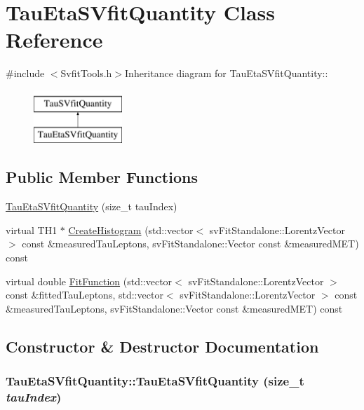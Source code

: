 \hypertarget{classTauEtaSVfitQuantity}{
\section{TauEtaSVfitQuantity Class Reference}
\label{classTauEtaSVfitQuantity}
}


{\ttfamily \#include $<$SvfitTools.h$>$}Inheritance diagram for TauEtaSVfitQuantity::\begin{figure}[H]
\begin{center}
\leavevmode
\includegraphics[height=2cm]{classTauEtaSVfitQuantity}
\end{center}
\end{figure}
\subsection*{Public Member Functions}
\begin{DoxyCompactItemize}
\item 
\hyperlink{classTauEtaSVfitQuantity_a4383847f18c2d940fcaea53dd3f7b3c7}{TauEtaSVfitQuantity} (size\_\-t tauIndex)
\item 
virtual TH1 $\ast$ \hyperlink{classTauEtaSVfitQuantity_a4b2d7ac673195e81b28a9c60e9dd0160}{CreateHistogram} (std::vector$<$ svFitStandalone::LorentzVector $>$ const \&measuredTauLeptons, svFitStandalone::Vector const \&measuredMET) const 
\item 
virtual double \hyperlink{classTauEtaSVfitQuantity_a4504c53a6e351cabadfc3c219bbe84c5}{FitFunction} (std::vector$<$ svFitStandalone::LorentzVector $>$ const \&fittedTauLeptons, std::vector$<$ svFitStandalone::LorentzVector $>$ const \&measuredTauLeptons, svFitStandalone::Vector const \&measuredMET) const 
\end{DoxyCompactItemize}


\subsection{Constructor \& Destructor Documentation}
\hypertarget{classTauEtaSVfitQuantity_a4383847f18c2d940fcaea53dd3f7b3c7}{
\subsubsection[{TauEtaSVfitQuantity}]{\setlength{\rightskip}{0pt plus 5cm}TauEtaSVfitQuantity::TauEtaSVfitQuantity (size\_\-t {\em tauIndex})}}
\label{classTauEtaSVfitQuantity_a4383847f18c2d940fcaea53dd3f7b3c7}


